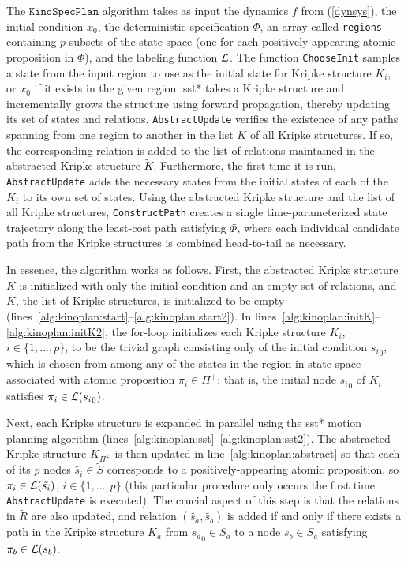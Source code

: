 The $\texttt{KinoSpecPlan}$ algorithm takes as input the dynamics $f$ from (\ref{dynsys}), the initial condition $x_0$, the deterministic \mucalc{} specification $\Phi$, an array called \texttt{regions} containing $p$ subsets of the state space (one for each positively-appearing atomic proposition in $\Phi$), and the labeling function $\mathcal{L}$. The function \texttt{ChooseInit} samples a state from the input region to use as the initial state for Kripke structure $K_i$, or $x_0$ if it exists in the given region. \gls{sst}* takes a Kripke structure and incrementally grows the structure using forward propagation, thereby updating its set of states and relations. \texttt{AbstractUpdate} verifies the existence of any paths spanning from one region to another in the list $K$ of all Kripke structures. If so, the corresponding relation is added to the list of relations maintained in the abstracted Kripke structure $\tilde{K}$. Furthermore, the first time it is run, \texttt{AbstractUpdate} adds the necessary states from the initial states of each of the $K_i$ to its own set of states. Using the abstracted Kripke structure and the list of all Kripke structures, \texttt{ConstructPath} creates a single time-parameterized state trajectory along the least-cost path satisfying $\Phi$, where each individual candidate path from the Kripke structures is combined head-to-tail as necessary. 

In essence, the algorithm works as follows. First, the abstracted Kripke structure $\tilde{K}$ is initialized with only the initial condition and an empty set of relations, and $K$, the list of Kripke structures, is initialized to be empty (lines~\ref{alg:kinoplan:start}--\ref{alg:kinoplan:start2}). In lines~\ref{alg:kinoplan:initK}--\ref{alg:kinoplan:initK2}, the for-loop initializes each Kripke structure $K_i$, $i \in \{ 1,\ldots,p \}$, to be the trivial graph consisting only of the initial condition ${s_i}_0$, which is chosen from among any of the states in the region in state space associated with atomic proposition $\pi_i \in \Pi^+$; that is, the initial node ${s_i}_0$ of $K_i$ satisfies $\pi_i \in \mathcal{L}({s_i}_0)$.

Next, each Kripke structure is expanded in parallel using the \gls{sst}* motion planning algorithm (lines~\ref{alg:kinoplan:sst}--\ref{alg:kinoplan:sst2}).
The abstracted Kripke structure $\tilde{K}_{\Pi^+}$ is then updated in line~\ref{alg:kinoplan:abstract} so that each of its $p$ nodes $\tilde{s_i} \in \tilde{S}$ corresponds to a positively-appearing atomic proposition, so $\pi_i \in \mathcal{L}(\tilde{s_i})$, $i \in \{ 1, \ldots, p \}$ (this particular procedure only occurs the first time \texttt{AbstractUpdate} is executed). 
The crucial aspect of this step is that the relations in $\tilde{R}$ are also updated, and relation $(\tilde{s_a}, \tilde{s_b})$ is added if and only if there exists a path in the Kripke structure $K_a$ from ${s_a}_0 \in S_a$ to a node ${s_b} \in S_a$ satisfying $\pi_b \in \mathcal{L}(s_b)$.

